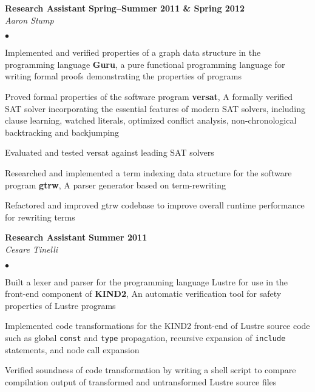\documentclass[10pt,letterpaper]{article}
\renewenvironment{itemize}{
  \begin{list}{}{
      \setlength{\leftmargin}{1.5em}
      \setlength{\itemsep}{0.25em}
      \setlength{\parskip}{0pt}
      \setlength{\parsep}{0.25em}
    }
  }{
  \end{list}
}
\newenvironment{bitemize}{
  \begin{list}{$\bullet$}{
      \setlength{\leftmargin}{1.5em}
      \setlength{\itemsep}{0.25em}
      \setlength{\parskip}{0pt}
      \setlength{\parsep}{0.25em}
    }
  }{
  \end{list}
}
\begin{document}
\begin{itemize}
\item \textbf{Research Assistant} \hfill \textbf{Spring--Summer 2011
    \& Spring 2012}\\
  \textit{Aaron Stump}
  \begin{bitemize}
  \item Implemented and verified properties of a graph data structure
    in the programming language \textbf{Guru}, a pure functional
    programming language for writing formal proofs demonstrating the
    properties of programs
  \item Proved formal properties of the software program
    \textbf{versat}, A formally verified SAT solver incorporating the
    essential features of modern SAT solvers, including clause
    learning, watched literals, optimized conflict analysis,
    non-chronological backtracking and backjumping
  \item Evaluated and tested versat against leading SAT solvers
  \item Researched and implemented a term indexing data structure for
    the software program \textbf{gtrw}, A parser generator based on
    term-rewriting
  \item Refactored and improved gtrw codebase to improve overall
    runtime performance for rewriting terms
  \end{bitemize}
\item \textbf{Research Assistant} \hfill \textbf{Summer 2011}\\
  \textit{Cesare Tinelli}
  \begin{bitemize}
  \item Built a lexer and parser for the programming language Lustre
    for use in the front-end component of \textbf{KIND2}, An automatic
    verification tool for safety properties of Lustre programs
  \item Implemented code transformations for the KIND2 front-end of
    Lustre source code such as global \texttt{const} and \texttt{type}
    propagation, recursive expansion of \texttt{include} statements,
    and node call expansion
  \item Verified soundness of code transformation by writing a shell
    script to compare compilation output of transformed and
    untransformed Lustre source files
  \end{bitemize}
\end{itemize}
\end{document}
